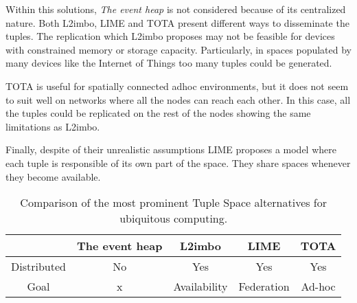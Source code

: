 \bigskip


Within this solutions, \emph{The event heap} is not considered because of its centralized nature.
Both L2imbo, LIME and TOTA present different ways to disseminate the tuples.
The replication which L2imbo proposes may not be feasible for devices with constrained memory or storage capacity.
Particularly, in spaces populated by many devices like the Internet of Things too many tuples could be generated.

TOTA is useful for spatially connected adhoc environments, but it does not seem to suit well on networks where all the nodes can reach each other.
In this case, all the tuples could be replicated on the rest of the nodes showing the same limitations as L2imbo.%

Finally, despite of their unrealistic assumptions LIME proposes a model where each tuple is responsible of its own part of the space.
They share spaces whenever they become available.


\begin{table}%
  \centering
  \begin{tabular}{c|cccc}%
      ~ & The event heap & L2imbo & LIME & TOTA \\
      \hline
      \hline
      Distributed & No & Yes & Yes & Yes \\
      Goal & x & Availability & Federation & Ad-hoc \\
  \end{tabular}
  \caption{Comparison of the most prominent Tuple Space alternatives for ubiquitous computing.} %
  \label{tab:myfirsttable}
\end{table}